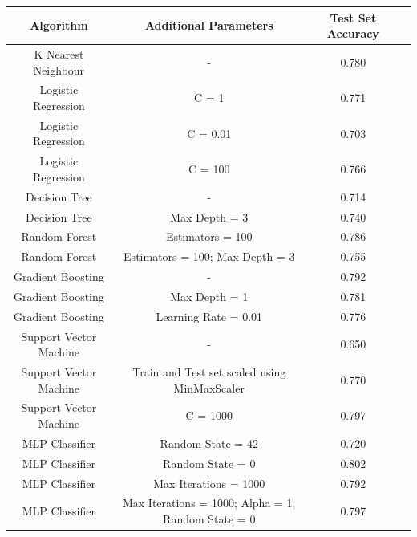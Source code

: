 \documentclass[12pt]{article}
\begin{document}
{
\clearpage
\thispagestyle{empty}
\begin{landscape}
\centering
\begin{table}[]
\centering
\begin{tabular}{|c|c|c|c|}
\hline
Algorithm              & Additional Parameters                               & Test Set Accuracy \\ \hline
K Nearest Neighbour    & -                                                   & 0.780             \\ \hline
Logistic Regression    & C = 1                                               & 0.771             \\ \hline
Logistic Regression    & C = 0.01                                            & 0.703             \\ \hline
Logistic Regression    & C = 100                                             & 0.766             \\ \hline
Decision Tree          & -                                                   & 0.714             \\ \hline
Decision Tree          & Max Depth = 3                                       & 0.740             \\ \hline
Random Forest          & Estimators = 100                                    & 0.786             \\ \hline
Random Forest          & Estimators = 100; Max Depth = 3                     & 0.755             \\ \hline
Gradient Boosting      & -                                                   & 0.792             \\ \hline
Gradient Boosting      & Max Depth = 1                                       & 0.781             \\ \hline
Gradient Boosting      & Learning Rate = 0.01                                & 0.776             \\ \hline
Support Vector Machine & -                                                   & 0.650             \\ \hline
Support Vector Machine & Train and Test set scaled using MinMaxScaler        & 0.770              \\ \hline
Support Vector Machine & C = 1000                                            & 0.797             \\ \hline
MLP Classifier         & Random State = 42                                   & 0.720              \\ \hline
MLP Classifier         & Random State = 0                                    & 0.802             \\ \hline
MLP Classifier         & Max Iterations = 1000                               & 0.792             \\ \hline
MLP Classifier         & Max Iterations = 1000; Alpha = 1; Random State = 0  & 0.797             \\ \hline
\end{tabular}
\end{table}
\label{table:3}
\end{landscape}
\clearpage
}
\end{document}

